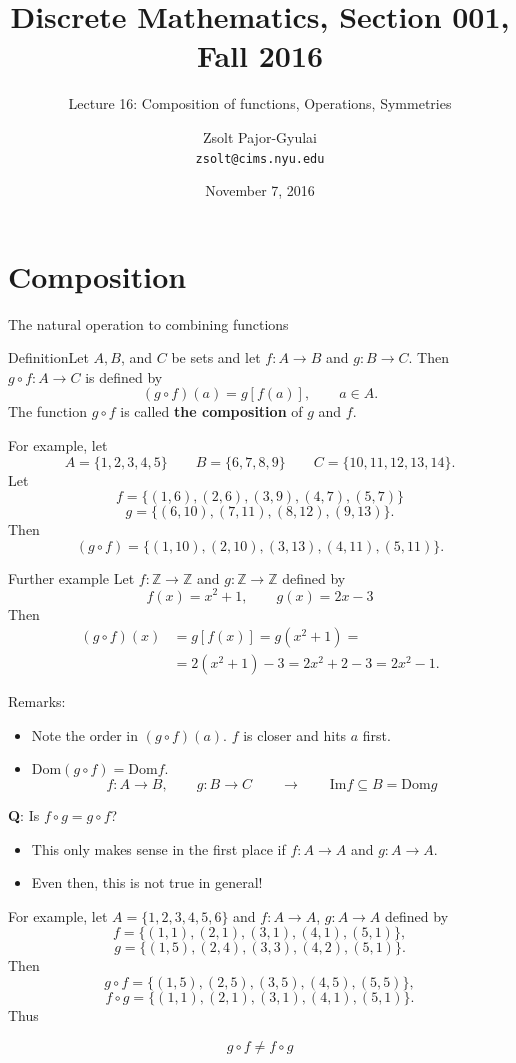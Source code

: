 \documentclass{beamer}
\title{Discrete Mathematics, Section 001, Fall 2016}
\subtitle{Lecture 16: Composition of functions, Operations, Symmetries}
\date{November 7, 2016}
\author[Zsolt]{Zsolt Pajor-Gyulai \\ \texttt{zsolt@cims.nyu.edu}}
\institute[NYU] 
{
\normalsize Courant Institute of Mathematical Sciences
}
\def\bl[#1]#2{\begin{block}{#1}#2\end{block}}
\def\itemb{\begin{itemize}}
\def\iteme{\end{itemize}}
\begin{document}
\begin{frame}
  \titlepage
\end{frame}


\section{Composition}

\begin{frame}{The natural operation to combining functions}
\bl[Definition]{Let $A,B$, and $C$ be sets and let $f:A\to B$ and $g:B\to C$. Then $g\circ f:A\to C$ is defined by
\[
(g\circ f)(a)=g[f(a)],\qquad a\in A.
\]
The function $g\circ f$ is called \textbf{the composition} of $g$ and $f$.}
For example, let 
\[
A=\{1,2,3,4,5\}\qquad B=\{6,7,8,9\}\qquad C=\{10,11,12,13,14\}.
\]
Let \vspace{-0.3cm}
\[
f=\{(1,6),(2,6),(3,9),(4,7),(5,7)\}
\]
\[
g=\{(6,10),(7,11),(8,12),(9,13)\}.
\]\vspace{-0.2cm}
Then\vspace{-0.2cm}
\[
(g\circ f)=\{(1,10),(2,10),(3,13),(4,11),(5,11)\}.
\]
\end{frame}

\begin{frame}
\bl[Further example]{
Let $f:\mathbb{Z}\to\mathbb{Z}$ and $g:\mathbb{Z}\to\mathbb{Z}$ defined by
\[
f(x)=x^2+1,\qquad g(x)=2x-3
\]
Then
\begin{align*}
(g\circ f)(x)&=g[f(x)]=g(x^2+1)=\\
&=2(x^2+1)-3=2x^2+2-3=2x^2-1.
\end{align*}}

Remarks:
\itemb
\item Note the order in $(g\circ f)(a)$. $f$ is closer and hits $a$ first.
\item $\textrm{Dom}(g\circ f)=\textrm{Dom}f$.
\[
f:A\to B,\qquad g:B\to C\qquad \to\qquad\textrm{Im}f\subseteq B=\textrm{Dom}g
\]
\iteme

\end{frame}

\begin{frame}
\bl[]{\textbf{Q}: Is $f\circ g=g\circ f$?}
\itemb
\item This only makes sense in the first place if $f:A\to A$ and $g:A\to A$.
\item Even then, this is not true in general!
\iteme
For example, let $A=\{1,2,3,4,5,6\}$ and $f:A\to A$, $g:A\to A$ defined by
\[
f=\{(1,1),(2,1),(3,1),(4,1),(5,1)\},
\]
\[
g=\{(1,5),(2,4),(3,3),(4,2),(5,1)\}.
\]
Then
\[
g\circ f=\{(1,5),(2,5),(3,5),(4,5),(5,5)\},
\]
\[
f\circ g=\{(1,1),(2,1),(3,1),(4,1),(5,1)\}.
\]
Thus
\bl[]{\[
g\circ f\neq f\circ g
\]}
\end{frame}
\end{document}
